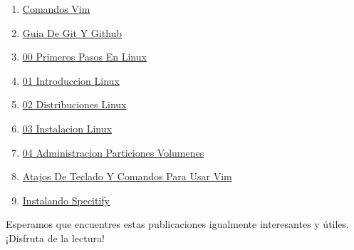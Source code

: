 \documentclass[
  jou,
  floatsintext,
  longtable,
  a4paper,
  nolmodern,
  notxfonts,
  notimes,
  colorlinks=true,linkcolor=blue,citecolor=blue,urlcolor=blue]{apa7}
\begin{document}
\begin{enumerate}
{  Enlaces Duros O Hard Link En Linux}
\item
  \href{https://achalmaedison.netlify.app/tecnologia-seguridad/operating-system/2022-09-27-comandos-vim/index.pdf}{}
  \href{https://achalmaedison.netlify.app/tecnologia-seguridad/operating-system/2022-09-27-comandos-vim}{Comandos
  Vim}
\item
  \href{https://achalmaedison.netlify.app/tecnologia-seguridad/operating-system/2023-02-16-guia-de-git-y-github/index.pdf}{}
  \href{https://achalmaedison.netlify.app/tecnologia-seguridad/operating-system/2023-02-16-guia-de-git-y-github}{Guia
  De Git Y Github}
\item
  \href{https://achalmaedison.netlify.app/tecnologia-seguridad/operating-system/2023-05-02-00-primeros-pasos-en-linux/index.pdf}{}
  \href{https://achalmaedison.netlify.app/tecnologia-seguridad/operating-system/2023-05-02-00-primeros-pasos-en-linux}{00
  Primeros Pasos En Linux}
\item
  \href{https://achalmaedison.netlify.app/tecnologia-seguridad/operating-system/2023-06-17-01-introduccion-linux/index.pdf}{}
  \href{https://achalmaedison.netlify.app/tecnologia-seguridad/operating-system/2023-06-17-01-introduccion-linux}{01
  Introduccion Linux}
\item
  \href{https://achalmaedison.netlify.app/tecnologia-seguridad/operating-system/2023-06-18-02-distribuciones-linux/index.pdf}{}
  \href{https://achalmaedison.netlify.app/tecnologia-seguridad/operating-system/2023-06-18-02-distribuciones-linux}{02
  Distribuciones Linux}
\item
  \href{https://achalmaedison.netlify.app/tecnologia-seguridad/operating-system/2023-06-19-03-instalacion-linux/index.pdf}{}
  \href{https://achalmaedison.netlify.app/tecnologia-seguridad/operating-system/2023-06-19-03-instalacion-linux}{03
  Instalacion Linux}
\item
  \href{https://achalmaedison.netlify.app/tecnologia-seguridad/operating-system/2023-06-20-04-administracion-particiones-volumenes/index.pdf}{}
  \href{https://achalmaedison.netlify.app/tecnologia-seguridad/operating-system/2023-06-20-04-administracion-particiones-volumenes}{04
  Administracion Particiones Volumenes}
\item
  \href{https://achalmaedison.netlify.app/tecnologia-seguridad/operating-system/2023-07-01-atajos-de-teclado-y-comandos-para-usar-vim/index.pdf}{}
  \href{https://achalmaedison.netlify.app/tecnologia-seguridad/operating-system/2023-07-01-atajos-de-teclado-y-comandos-para-usar-vim}{Atajos
  De Teclado Y Comandos Para Usar Vim}
\item
  \href{https://achalmaedison.netlify.app/tecnologia-seguridad/operating-system/2024-07-15-instalando-specitify/index.pdf}{}
  \href{https://achalmaedison.netlify.app/tecnologia-seguridad/operating-system/2024-07-15-instalando-specitify}{Instalando
  Specitify}
\end{enumerate}

Esperamos que encuentres estas publicaciones igualmente interesantes y
útiles. ¡Disfruta de la lectura!
\end{document}
